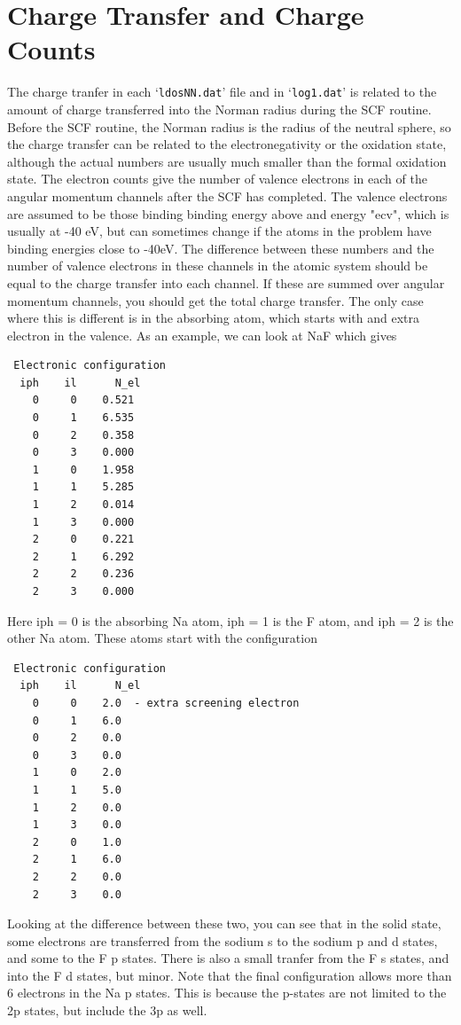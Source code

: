 \documentclass[11pt,oneside]{report} %
\newcommand{\file}[1]{`\texttt{#1}'}
\begin{document}

\section{Charge Transfer and Charge Counts}
\label{sec:ChargeTransfer}

The charge tranfer in each \file{ldosNN.dat} file and in \file{log1.dat} is related to the amount of charge transferred into the Norman radius during the SCF routine. Before the SCF routine, the Norman radius is the radius of the neutral sphere, so the charge transfer can be related to the electronegativity or the oxidation state, although the actual numbers are usually much smaller than the formal oxidation state. The electron counts give the number of valence electrons in each of the angular momentum channels after the SCF has completed. The valence electrons are assumed to be those binding binding energy above and energy "ecv", which is usually at -40 eV, but can sometimes change if the atoms in the problem have binding energies close to -40eV. The difference between these numbers and the number of valence electrons in these channels in the atomic system should be equal to the charge transfer into each channel. If these are summed over angular momentum channels, you should get the total charge transfer. The only case where this is different is in the absorbing atom, which starts with and extra electron in the valence. As an example, we can look at NaF which gives

\begin{verbatim}
 Electronic configuration
  iph    il      N_el
    0     0    0.521
    0     1    6.535
    0     2    0.358
    0     3    0.000
    1     0    1.958
    1     1    5.285
    1     2    0.014
    1     3    0.000
    2     0    0.221
    2     1    6.292
    2     2    0.236
    2     3    0.000
\end{verbatim}
Here iph = 0 is the absorbing Na atom, iph = 1 is the F atom, and iph = 2 is
the other Na atom. These atoms start with the configuration
\begin{verbatim}
 Electronic configuration
  iph    il      N_el
    0     0    2.0  - extra screening electron
    0     1    6.0
    0     2    0.0
    0     3    0.0
    1     0    2.0
    1     1    5.0
    1     2    0.0
    1     3    0.0
    2     0    1.0
    2     1    6.0
    2     2    0.0
    2     3    0.0
\end{verbatim}
Looking at the difference between these two, you can see that in the solid state, some electrons are transferred from the sodium s to the sodium p and d states, and some to the F p states. There is also a small tranfer from the F s states, and into the F d states, but minor. Note that the final configuration allows more than 6 electrons in the Na p states. This is because the p-states are not limited to the 2p states, but include the 3p as well.
\end{document}
